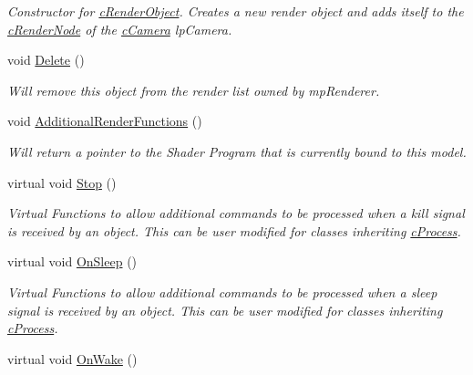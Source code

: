 \begin{DoxyCompactItemize}
\begin{DoxyCompactList}\small\item\em Constructor for \hyperlink{classc_render_object}{cRenderObject}. Creates a new render object and adds itself to the \hyperlink{classc_render_node}{cRenderNode} of the \hyperlink{classc_camera}{cCamera} lpCamera. \end{DoxyCompactList}\item 
\hypertarget{classc_render_object_a7f1424d2badbe9e09bc6fd4af6616fa0}{
void \hyperlink{classc_render_object_a7f1424d2badbe9e09bc6fd4af6616fa0}{Delete} ()}
\label{classc_render_object_a7f1424d2badbe9e09bc6fd4af6616fa0}

\begin{DoxyCompactList}\small\item\em Will remove this object from the render list owned by mpRenderer. \end{DoxyCompactList}\item 
\hypertarget{classc_render_object_a1a023520677b50e63fc2334717a2761d}{
void \hyperlink{classc_render_object_a1a023520677b50e63fc2334717a2761d}{AdditionalRenderFunctions} ()}
\label{classc_render_object_a1a023520677b50e63fc2334717a2761d}

\begin{DoxyCompactList}\small\item\em Will return a pointer to the Shader Program that is currently bound to this model. \end{DoxyCompactList}\item 
\hypertarget{classc_render_object_a4e4d06cfc220b466c5057105c10d658c}{
virtual void \hyperlink{classc_render_object_a4e4d06cfc220b466c5057105c10d658c}{Stop} ()}
\label{classc_render_object_a4e4d06cfc220b466c5057105c10d658c}

\begin{DoxyCompactList}\small\item\em Virtual Functions to allow additional commands to be processed when a kill signal is received by an object. This can be user modified for classes inheriting \hyperlink{classc_process}{cProcess}. \end{DoxyCompactList}\item 
\hypertarget{classc_render_object_a59b3e3fc3d973b88483db3a802fc4744}{
virtual void \hyperlink{classc_render_object_a59b3e3fc3d973b88483db3a802fc4744}{OnSleep} ()}
\label{classc_render_object_a59b3e3fc3d973b88483db3a802fc4744}

\begin{DoxyCompactList}\small\item\em Virtual Functions to allow additional commands to be processed when a sleep signal is received by an object. This can be user modified for classes inheriting \hyperlink{classc_process}{cProcess}. \end{DoxyCompactList}\item 
\hypertarget{classc_render_object_ae64dcff609168192347a8fd833325bcb}{
virtual void \hyperlink{classc_render_object_ae64dcff609168192347a8fd833325bcb}{OnWake} ()}
\label{classc_render_object_ae64dcff609168192347a8fd833325bcb}


\end{DoxyCompactItemize}
